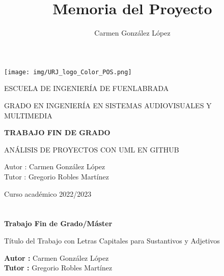 \documentclass[a4paper, 12pt]{book}
\title{Memoria del Proyecto}
\author{Carmen González López}
\begin{document}
\renewcommand{\refname}{Bibliografía}  %
\renewcommand{\appendixname}{Apéndice}


\begin{titlepage}
\begin{center}
\texttt{[image: img/URJ\_logo\_Color\_POS.png]}

\vspace{1.75cm}

\LARGE
ESCUELA DE INGENIERÍA DE FUENLABRADA
\vspace{1cm}

\LARGE
GRADO EN INGENIERÍA EN SISTEMAS AUDIOVISUALES Y MULTIMEDIA

\vspace{1cm}
\LARGE
\textbf{TRABAJO FIN DE GRADO}

\vspace{2cm}

\Large
ANÁLISIS DE PROYECTOS CON UML EN GITHUB

\vspace{2cm}

\large
Autor : Carmen González López \\
Tutor : Gregorio Robles Martínez\\
\vspace{1cm}

\large
Curso académico 2022/2023

\end{center}
\end{titlepage}

\newpage
\mbox{}
\thispagestyle{empty} %


\clearpage
{}
\chapter*{}

\vspace{-4cm}
\begin{center}
\LARGE
\textbf{Trabajo Fin de Grado/Máster}

\vspace{1cm}
\large
Título del Trabajo con Letras Capitales para Sustantivos y Adjetivos

\vspace{1cm}
\large
\textbf{Autor :} Carmen González López\\
\textbf{Tutor :} Gregorio Robles Martínez

\end{center}
\end{document}
